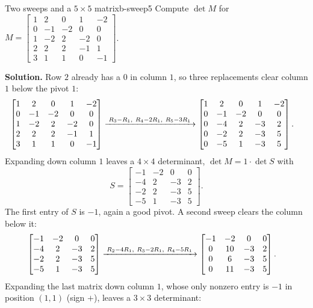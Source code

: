 \documentclass[11pt]{article}
\begin{document}
\begin{exmp}{Two sweeps and a $5\times5$ matrix}{b-sweep5}
Compute $\det M$ for $M=\begin{bmatrix}1&2&0&1&-2\\0&-1&-2&0&0\\1&-2&2&-2&0\\2&2&2&-1&1\\3&1&1&0&-1\end{bmatrix}$.

\textbf{Solution.} Row $2$ already has a $0$ in column $1$, so three replacements clear column $1$ below the pivot $1$:
\begin{align*}
\begin{bmatrix}1&2&0&1&-2\\0&-1&-2&0&0\\1&-2&2&-2&0\\2&2&2&-1&1\\3&1&1&0&-1\end{bmatrix}
&\xrightarrow{\;R_3-R_1,\ R_4-2R_1,\ R_5-3R_1\;}
\begin{bmatrix}1&2&0&1&-2\\0&-1&-2&0&0\\0&-4&2&-3&2\\0&-2&2&-3&5\\0&-5&1&-3&5\end{bmatrix}
.
\end{align*}
Expanding down column $1$ leaves a $4\times4$ determinant, $\det M=1\cdot\det S$ with
\[
S=\begin{bmatrix}-1&-2&0&0\\-4&2&-3&2\\-2&2&-3&5\\-5&1&-3&5\end{bmatrix}.
\]
The first entry of $S$ is $-1$, again a good pivot. A second sweep clears the column below it:
\begin{align*}
\begin{bmatrix}-1&-2&0&0\\-4&2&-3&2\\-2&2&-3&5\\-5&1&-3&5\end{bmatrix}
&\xrightarrow{\;R_2-4R_1,\ R_3-2R_1,\ R_4-5R_1\;}
\begin{bmatrix}-1&-2&0&0\\0&10&-3&2\\0&6&-3&5\\0&11&-3&5\end{bmatrix}
.
\end{align*}
Expanding the last matrix down column $1$, whose only nonzero entry is $-1$ in position $(1,1)$ (sign $+$), leaves a $3\times3$ determinant:

\end{exmp}
\end{document}
